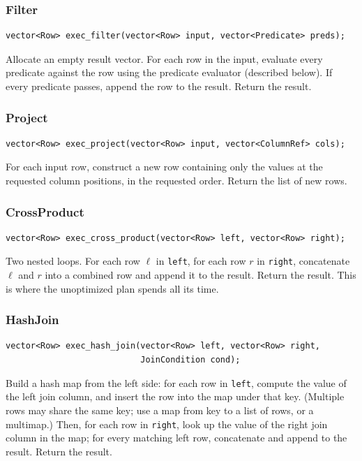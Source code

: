 \documentclass[11pt,a4paper]{article}
\begin{document}
\subsubsection{Filter}
\begin{codebox}
\begin{lstlisting}
vector<Row> exec_filter(vector<Row> input, vector<Predicate> preds);
\end{lstlisting}
\end{codebox}
Allocate an empty result vector. For each row in the input, evaluate every predicate against the row using the predicate evaluator (described below). If every predicate passes, append the row to the result. Return the result.

\subsubsection{Project}
\begin{codebox}
\begin{lstlisting}
vector<Row> exec_project(vector<Row> input, vector<ColumnRef> cols);
\end{lstlisting}
\end{codebox}
For each input row, construct a new row containing only the values at the requested column positions, in the requested order. Return the list of new rows.

\subsubsection{CrossProduct}
\begin{codebox}
\begin{lstlisting}
vector<Row> exec_cross_product(vector<Row> left, vector<Row> right);
\end{lstlisting}
\end{codebox}
Two nested loops. For each row $\ell$ in \texttt{left}, for each row $r$ in \texttt{right}, concatenate $\ell$ and $r$ into a combined row and append it to the result. Return the result. This is where the unoptimized plan spends all its time.

\subsubsection{HashJoin}
\begin{codebox}
\begin{lstlisting}
vector<Row> exec_hash_join(vector<Row> left, vector<Row> right,
                           JoinCondition cond);
\end{lstlisting}
\end{codebox}
Build a hash map from the left side: for each row in \texttt{left}, compute the value of the left join column, and insert the row into the map under that key. (Multiple rows may share the same key; use a map from key to a list of rows, or a multimap.) Then, for each row in \texttt{right}, look up the value of the right join column in the map; for every matching left row, concatenate and append to the result. Return the result.
\end{document}
